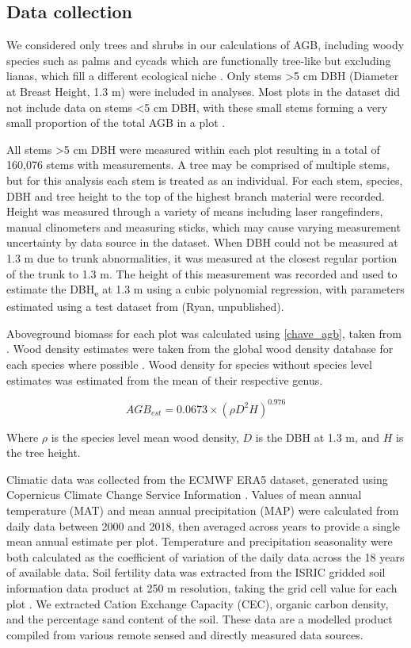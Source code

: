 \documentclass[11pt,a4paper]{article}
\begin{document}
\subsection{Data collection}
 
We considered only trees and shrubs in our calculations of AGB, including woody species such as palms and cycads which are functionally tree-like but excluding lianas, which fill a different ecological niche \citep{}. Only stems >5 cm DBH (Diameter at Breast Height, 1.3 m) were included in analyses. Most plots in the dataset did not include data on stems <5 cm DBH, with these small stems forming a very small proportion of the total AGB in a plot \citep{}.


All stems >5 cm DBH were measured within each plot resulting in a total of 160,076 stems with measurements. A tree may be comprised of multiple stems, but for this analysis each stem is treated as an individual. For each stem, species, DBH and tree height to the top of the highest branch material were recorded. Height was measured through a variety of means including laser rangefinders, manual clinometers and measuring sticks, which may cause varying measurement uncertainty by data source in the dataset. When DBH could not be measured at 1.3 m due to trunk abnormalities, it was measured at the closest regular portion of the trunk to 1.3 m. The height of this measurement was recorded and used to estimate the DBH\textsubscript{e} at 1.3 m using a cubic polynomial regression, with parameters estimated using a test dataset from (Ryan, unpublished).

Aboveground biomass for each plot was calculated using \autoref{chave_agb}, taken from \citet{Chave2014}. Wood density estimates were taken from the global wood density database for each species where possible \citep{Chave2009, Zanne2009}. Wood density for species without species level estimates was estimated from the mean of their respective genus. 

\begin{equation}
	AGB_{est} = 0.0673 \times (\rho D^{2} H)^{0.976}
	\label{chave_agb}
\end{equation}

Where $\rho$ is the species level mean wood density, $D$ is the DBH at 1.3 m, and $H$ is the tree height.

Climatic data was collected from the ECMWF ERA5 dataset, generated using Copernicus Climate Change Service Information \citep{ERA5}. Values of mean annual temperature (MAT) and mean annual precipitation (MAP) were calculated from daily data between 2000 and 2018, then averaged across years to provide a single mean annual estimate per plot. Temperature and precipitation seasonality were both calculated as the coefficient of variation of the daily data across the 18 years of available data. Soil fertility data was extracted from the ISRIC gridded soil information data product at 250 m resolution, taking the grid cell value for each plot \citep{Hengl2017}. We extracted Cation Exchange Capacity (CEC), organic carbon density, and the percentage sand content of the soil. These data are a modelled product compiled from various remote sensed and directly measured data sources. 
\end{document}
